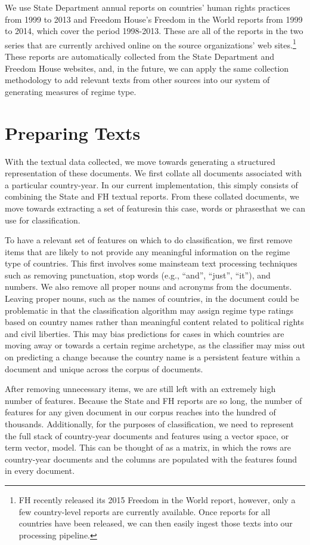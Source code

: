 \documentclass[pdftex,12pt,fullpage,oneside]{amsart}
\begin{document}
We use State Department annual reports on countries' human rights practices from 1999 to 2013 and Freedom House's Freedom in the World reports from 1999 to 2014, which cover the period 1998-2013. These are all of the reports in the two series that are currently archived online on the source organizations' web sites.\footnote{FH recently released its 2015 Freedom in the World report, however, only a few country-level reports are currently available. Once reports for all countries have been released, we can then easily ingest those texts into our processing pipeline.} These reports are automatically collected from the State Department and Freedom House websites, and, in the future, we can apply the same collection methodology to add relevant texts from other sources into our system of generating measures of regime type.

\section{Preparing Texts}

With the textual data collected, we move towards generating a structured representation of these documents. We first collate all documents associated with a particular country-year. In our current implementation, this simply consists of combining the State and FH textual reports. From these collated documents, we move towards extracting a set of features\textemdash in this case, words or phrases\textemdash that we can use for classification. 

To have a relevant set of features on which to do classification, we first remove items that are likely to not provide any meaningful information on the regime type of countries. This first involves some mainsteam text processing techniques such as removing punctuation, stop words (e.g., ``and'', ``just'', ``it''), and numbers. We also remove all proper nouns and acronyms from the documents. Leaving proper nouns, such as the names of countries, in the document could be problematic in that the classification algorithm may assign regime type ratings based on country names rather than meaningful content related to political rights and civil liberties. This may bias predictions for cases in which countries are moving away or towards a certain regime archetype, as the classifier may miss out on predicting a change because the country name is a persistent feature within a document and unique across the corpus of documents.

After removing unnecessary items, we are still left with an extremely high number of features. Because the State and FH reports are so long, the number of features for any given document in our corpus reaches into the hundred of thousands. Additionally, for the purposes of classification, we need to represent the full stack of country-year documents and features using a vector space, or term vector, model. This can be thought of as a matrix, in which the rows are country-year documents and the columns are populated with the features found in every document. 
\end{document}
